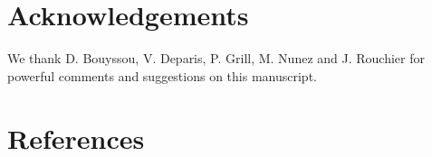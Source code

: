 \documentclass[preprint, french, english, 11pt, authoryear]{elsarticle}%
\begin{document}
\setcounter{secnumdepth}{0}
\section{Acknowledgements}
We thank D. Bouyssou, V. Deparis, P. Grill, M. Nunez and J. Rouchier for powerful comments and suggestions on this manuscript.

\section{References}

\end{document}
